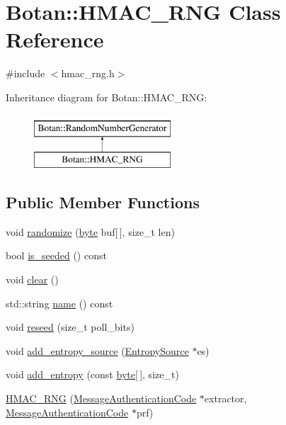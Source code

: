 \hypertarget{classBotan_1_1HMAC__RNG}{\section{Botan\-:\-:H\-M\-A\-C\-\_\-\-R\-N\-G Class Reference}
\label{classBotan_1_1HMAC__RNG}
}


{\ttfamily \#include $<$hmac\-\_\-rng.\-h$>$}

Inheritance diagram for Botan\-:\-:H\-M\-A\-C\-\_\-\-R\-N\-G\-:\begin{figure}[H]
\begin{center}
\leavevmode
\includegraphics[height=2.000000cm]{classBotan_1_1HMAC__RNG}
\end{center}
\end{figure}
\subsection*{Public Member Functions}
\begin{DoxyCompactItemize}
\item 
void \hyperlink{classBotan_1_1HMAC__RNG_a70cc900f156ee8de9eed010a00087677}{randomize} (\hyperlink{namespaceBotan_a7d793989d801281df48c6b19616b8b84}{byte} buf\mbox{[}$\,$\mbox{]}, size\-\_\-t len)
\item 
bool \hyperlink{classBotan_1_1HMAC__RNG_aaf20248771aced337d6764100825cded}{is\-\_\-seeded} () const 
\item 
void \hyperlink{classBotan_1_1HMAC__RNG_a4d17ebc5835675113fe974956a2858ed}{clear} ()
\item 
std\-::string \hyperlink{classBotan_1_1HMAC__RNG_a11b6292fdba3a43dbf0627fac1de5d67}{name} () const 
\item 
void \hyperlink{classBotan_1_1HMAC__RNG_acfead0dd1c84dd79594b71634986c767}{reseed} (size\-\_\-t poll\-\_\-bits)
\item 
void \hyperlink{classBotan_1_1HMAC__RNG_ad884434615e083203a1416cc42325e1a}{add\-\_\-entropy\-\_\-source} (\hyperlink{classBotan_1_1EntropySource}{Entropy\-Source} $\ast$es)
\item 
void \hyperlink{classBotan_1_1HMAC__RNG_a68838ec7a54aa4223f0a5f659f9a001a}{add\-\_\-entropy} (const \hyperlink{namespaceBotan_a7d793989d801281df48c6b19616b8b84}{byte}\mbox{[}$\,$\mbox{]}, size\-\_\-t)
\item 
\hyperlink{classBotan_1_1HMAC__RNG_a0b7018ac1737fd8b6fae64511bc9413e}{H\-M\-A\-C\-\_\-\-R\-N\-G} (\hyperlink{classBotan_1_1MessageAuthenticationCode}{Message\-Authentication\-Code} $\ast$extractor, \hyperlink{classBotan_1_1MessageAuthenticationCode}{Message\-Authentication\-Code} $\ast$prf)
\end{DoxyCompactItemize}

